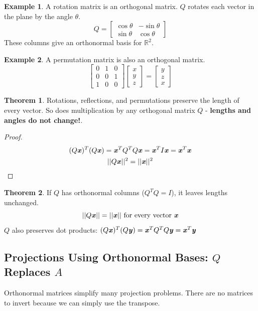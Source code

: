 \documentclass[12pt, letterpaper]{article}
\newcommand{\R}[1]{$\mathbb{R}^{#1}$}
\newcommand{\V}[1]{\textbf{\textit{#1}}}
\newcommand{\x}{\textbf{\textit{x}}}
\newcommand{\DefinitionSpace}{\vspace{15px}}
\theoremstyle{definition}
\newtheorem{example}{Example}
\newtheorem{theorem}{Theorem}
\begin{document}
	
	\begin{example}
		A rotation matrix is an orthogonal matrix. $Q$ rotates each vector in the plane by the angle $\theta$.
			$$Q = \begin{bmatrix}
						\cos{\theta} & -\sin{\theta}\\
						\sin{\theta} & \cos{\theta}
			\end{bmatrix}$$
			These columns give an orthonormal basis for \R{2}.
	\end{example}
\DefinitionSpace

	\begin{example}
		A permutation matrix is also an orthogonal matrix.
		\[\begin{bmatrix}
					0 & 1 & 0 \\
					0 & 0 & 1 \\
					1 & 0 & 0
				\end{bmatrix}\begin{bmatrix}
								x\\y\\z
								\end{bmatrix} = \begin{bmatrix}
													y\\z\\x
													\end{bmatrix} \]
	\end{example}
	\DefinitionSpace
	\begin{theorem}
		Rotations, reflections, and permutations preserve the length of every vector. So does multiplication by any orthogonal matrix $Q$ - \textbf{lengths and angles do not change!}.
	\end{theorem}
	\begin{proof}
		\begin{gather*}
			(Q\V{x})^T (Q\V{x}) = \V{x}^T Q^T Q \V{x} = \V{x}^T I \V{x} = \V{x}^T \V{x} \\
			||Q\V{x}||^2 = ||\V{x}||^2
		\end{gather*}
	\end{proof}
	\DefinitionSpace
	\begin{theorem}
		If $Q$ has orthonormal columns ($Q^T Q = I$), it leaves lengths unchanged.
		\[
		||Q\V{x}|| = ||\V{x}|| \text{ for every vector \V{x}}
		\]
		$Q$ also preserves dot products: $(Q\V{x})^T (Q\V{y}) = \V{x}^T Q^T Q\V{y} = \V{x}^T \V{y}$
	\end{theorem}
\subsection{Projections Using Orthonormal Bases: $Q$ Replaces $A$}
	Orthonormal matrices simplify many projection problems. There are no matrices to invert because we can simply use the transpose.
	
\end{document}

